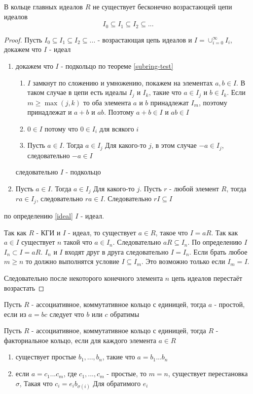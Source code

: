 \documentclass[../main/document.tex]{subfiles}
\begin{document}
\begin{thm}
В кольце главных идеалов $R$ не существует бесконечно возрастающей цепи идеалов
$$I_0\subseteq I_1\subseteq I_2\subseteq ...$$
\begin{proof}
Пусть $I_0\subseteq I_1\subseteq I_2\subseteq ...$ - возрастающая цепь идеалов и $I=\cup_{i=0}^\infty I_i$, докажем что $I$ - идеал
\begin{enumerate}
\item докажем что $I$ - подкольцо по теореме \ref{subring-test}
\begin{enumerate}
\item $I$ замкнут по сложению и умножению, покажем на элементах $a,b\in I$. В таком случае в цепи есть идеалы $I_j$ и $I_k$, такие что $a\in I_j$ и $b\in I_k$. Если $m\geq \max(j,k)$ то оба элемента $a$ и $b$ принадлежат $I_m$, поэтому принадлежат и $a+b$ и $ab$. Поэтому $a+b\in I$ и $ab\in I$
\item $0\in I$ потому что $0\in I_i$ для всякого $i$
\item Пусть $a\in I$. Тогда $a\in I_j$ Для какого-то $j$, в этом случае $-a\in I_j$, следовательно $-a\in I$
\end{enumerate}
следовательно $I$ - подкольцо
\item Пусть $a\in I$. Тогда $a\in I_j$ Для какого-то $j$. Пусть $r$ - любой элемент $R$, тогда $ra\in I_j$, следовательно $ra\in I$. Следовательно $rI\subseteq I$
\end{enumerate}
по определению \ref{ideal} $I$ - идеал.

Так как $R$ - КГИ и $I$ - идеал, то существует $a\in R$, такое что $I=aR$. Так как $a\in I$ существует $n$ такой что $a\in I_n$. Следовательно $aR\subseteq I_n$. По определению $I$ $I_n\subset I=aR$. $I_n$ и $I$ входят друг в друга следовательно $I=I_n$. Если брать любое $m\geq n$ то должно выполнятся условие $I\subseteq I_m$. Это возможно только если $I_m=I$.

 Следовательно после некоторого конечного элемента $n$ цепь идеалов перестаёт возрастать
\end{proof}
\end{thm}
\begin{dfn}
Пусть $R$ - ассоциативное, коммутативное кольцо с единицей, тогда $a$ - простой, если из $a=bc$ следует что $b$ или $c$ обратимы
\end{dfn}
\begin{dfn}
Пусть $R$ - ассоциативное, коммутативное кольцо с единицей, тогда $R$ - факториальное кольцо, если для каждого элемента $a\in R$
\begin{enumerate}
\item существует простые $b_1,...,b_n$, такие что $a=b_1...b_n$
\item если $a=c_1...c_m$, где $c_1,...,c_m$ - простые, то $m=n$, существует перестановка $\sigma$, Такая что $c_i=e_ib_{\sigma(i)}$ Для обратимого $e_i$
\end{enumerate} 
\end{dfn}
\end{document}
